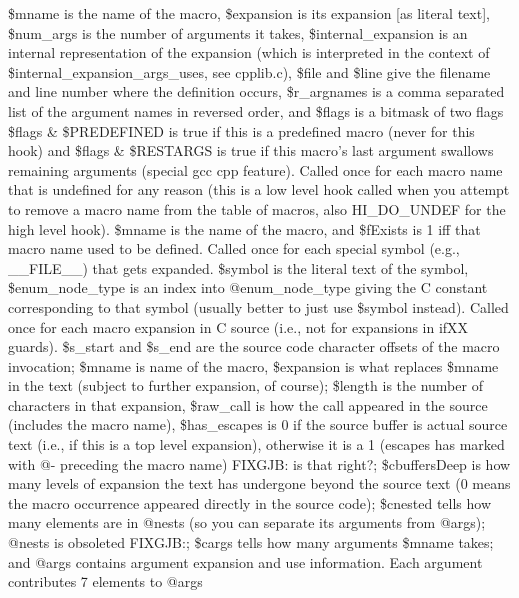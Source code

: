 \$mname is the name of the macro, \$expansion is its expansion [as literal text], 
\$num\_\-args is the number of arguments it takes, \$internal\_\-expansion is an
internal representation of the expansion (which is interpreted in the 
context of \$internal\_\-expansion\_\-args\_\-uses, see cpplib.c), \$file and \$line
give the filename and line number where the definition occurs, 
\$r\_\-argnames is a comma separated list of the
argument names in reversed order, and \$flags is a bitmask of two flags
\$flags \& \$PREDEFINED is true if this is a predefined macro (never for this hook)
and \$flags \& \$RESTARGS is true if this macro's last argument swallows 
remaining arguments (special gcc cpp feature).
Called once for each macro name that is undefined for any reason (this is
a low level hook called when you attempt to remove a macro name from the 
table of macros,
also HI\_\-DO\_\-UNDEF for the high level hook).  \$mname is the name of the
macro, and \$fExists is 1 iff that macro name used to be defined.
Called once for each special symbol (e.g., \_\-\_\-FILE\_\-\_\-) that gets expanded.
\$symbol is the literal text of the symbol, \$enum\_\-node\_\-type is an index
into @enum\_\-node\_\-type giving the C constant corresponding to that symbol
(usually better to just use \$symbol instead).
Called once for each macro expansion in C source (i.e., not for expansions
in \pphash{}ifXX guards). \$s\_\-start and \$s\_\-end are the source code character offsets
of the macro invocation; \$mname is name of the macro, \$expansion is what
replaces \$mname in the text (subject to further expansion, of course); \$length
is the number of characters in that expansion, \$raw\_\-call is how the call
appeared in the source (includes the macro name), \$has\_\-escapes is 0 if the
source buffer is actual source text (i.e., if this is a top level expansion),
otherwise it is a 1 (escapes has marked with @- preceding the macro name)
FIXGJB: is that right?; \$cbuffersDeep is how many levels of expansion the text
has undergone beyond the source text (0 means the macro occurrence appeared
directly in the source code); \$cnested tells how many elements are in @nests
(so you can separate its arguments from @args); @nests is obsoleted FIXGJB:;
\$cargs tells how many arguments \$mname takes; and @args contains argument
expansion and use information.  Each argument contributes 7 elements to @args
